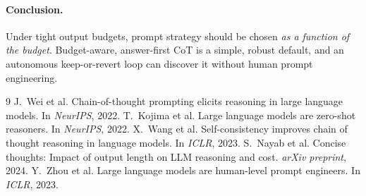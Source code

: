 \documentclass{article}
\begin{document}
\paragraph{Conclusion.} Under tight output budgets, prompt strategy should be
chosen \emph{as a function of the budget}. Budget-aware, answer-first CoT is a
simple, robust default, and an autonomous keep-or-revert loop can discover it
without human prompt engineering.

\small

\begin{thebibliography}{9}
J.~Wei et al.
\newblock Chain-of-thought prompting elicits reasoning in large language models.
\newblock In \emph{NeurIPS}, 2022.
T.~Kojima et al.
\newblock Large language models are zero-shot reasoners.
\newblock In \emph{NeurIPS}, 2022.
X.~Wang et al.
\newblock Self-consistency improves chain of thought reasoning in language models.
\newblock In \emph{ICLR}, 2023.
S.~Nayab et al.
\newblock Concise thoughts: Impact of output length on LLM reasoning and cost.
\newblock \emph{arXiv preprint}, 2024.
Y.~Zhou et al.
\newblock Large language models are human-level prompt engineers.
\newblock In \emph{ICLR}, 2023.
\end{thebibliography}
\end{document}
